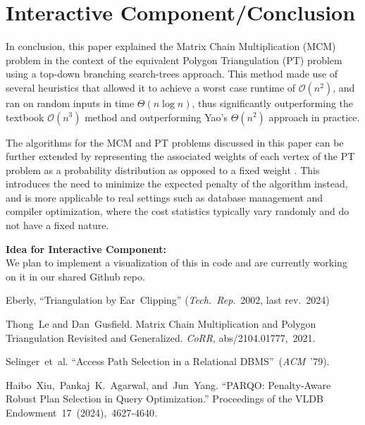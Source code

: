 \documentclass[12pt]{article}
\newcommand{\bigO}{\mathcal{O}}
\begin{document}
\section{Interactive Component/Conclusion}
In conclusion, this paper explained the Matrix Chain Multiplication (MCM) problem in the context of the equivalent Polygon Triangulation (PT) problem using a top-down branching search-trees approach. This method made use of several heuristics that allowed it to achieve a worst case runtime of $\bigO(n^2)$, and ran on random inputs in time $\Theta(n\log n)$, thus significantly outperforming the textbook $\bigO(n^3)$ method and outperforming Yao's $\Theta(n^2)$ approach in practice. 

The algorithms for the MCM and PT problems discussed in this paper can be further extended by representing the associated weights of each vertex of the PT problem as a probability distribution as opposed to a fixed weight \cite{Xiu}. This introduces the need to minimize the expected penalty of the algorithm instead, and is more applicable to real settings such as database management and compiler optimization, where the cost statistics typically vary randomly and do not have a fixed nature. 


\textbf{Idea for Interactive Component:}\\
We plan to implement a visualization of this in code and are currently working on it in our shared Github repo.


\begin{thebibliography}{99}          %

Eberly, “Triangulation by Ear Clipping” (\emph{Tech. Rep}. 2002, last rev. 2024)

Thong~Le and Dan~Gusfield.
Matrix Chain Multiplication and Polygon Triangulation Revisited and
Generalized.
\emph{CoRR}, abs/2104.01777, 2021.

Selinger et al. “Access Path Selection in a Relational DBMS” (\emph{ACM} ’79).

Haibo Xiu, Pankaj K. Agarwal, and Jun Yang.
“PARQO: Penalty‑Aware Robust Plan Selection in Query Optimization.”
Proceedings of the VLDB Endowment 17 (2024), 4627‑4640.


\end{thebibliography}
\end{document}
